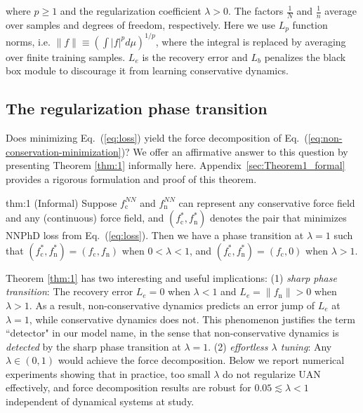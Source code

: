 \documentclass[aps,pre,reprint,superscriptaddress,nofootinbib,amsmath,amssymb]{revtex4-2}
\begin{document}
{\noindent where $p\geq 1$ and the regularization coefficient $\lambda>0$. The factors $\frac{1}{N}$ and $\frac{1}{n}$ average over samples and degrees of freedom, respectively.
Here we use $L_p$ function norms, i.e. $\|f\|\equiv (\int |f|^pd\mu)^{1/p}$, where the integral is replaced by averaging over finite training samples. $L_e$ is the recovery error and $L_b$ penalizes the black box module to discourage it from learning conservative dynamics.}

\subsection{The regularization phase transition}\label{subsec:phase_transition}

Does minimizing Eq.~(\ref{eq:loss}) yield the force decomposition of Eq.~(\ref{eq:non-conservation-minimization})? We offer an affirmative answer to this question by presenting Theorem \ref{thm:1} informally here. Appendix~\ref{sec:Theorem1_formal} provides a rigorous formulation and proof of this theorem.

\begin{reptheorem}{thm:1}
(Informal) Suppose $f_{\mathrm{c}}^{NN}$ and $f_{\mathrm{n}}^{NN}$ can represent any conservative force field and any (continuous) force field, and $(f_{\mathrm{c}}^*,f_{\mathrm{n}}^*)$ denotes the pair that minimizes NNPhD loss from Eq.~(\ref{eq:loss}). Then we have a phase transition at $\lambda=1$ such that $(f_{\mathrm{c}}^*,f_{\mathrm{n}}^*)=(f_{\mathrm{c}},f_{\mathrm{n}})$ when $0<\lambda<1$, and $(f_{\mathrm{c}}^*,f_{\mathrm{n}}^*)=(f_{\mathrm{c}},0)$ when $\lambda>1$.
\end{reptheorem}


Theorem \ref{thm:1} has two interesting and useful implications: (1) {\it sharp phase transition}: 
The recovery error $L_e=0$ when $\lambda<1$ and $L_e=\|f_{\mathrm{n}}\|>0$ when $\lambda>1$. As a result, non-conservative dynamics predicts an error jump of $L_e$ at $\lambda=1$, while conservative dynamics does not. This phenomenon justifies the term ``detector" in our model name, in the sense that non-conservative dynamics is \textit{detected} by the sharp phase transition at $\lambda=1$. (2) {\it effortless $\lambda$ tuning}: Any $\lambda\in(0,1)$ would achieve the force decomposition. Below we report numerical experiments showing that in practice, too small $\lambda$ do not regularize UAN effectively, and force decomposition results are robust for $0.05\lesssim\lambda<1$ independent of dynamical systems at study.
\end{document}
